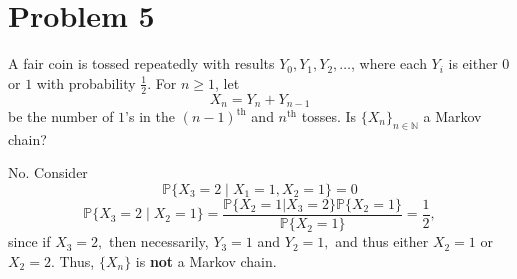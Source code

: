 \documentclass[11pt]{article}
\newcommand{\bbP}{\mathbb{P}}
\begin{document}
\section*{Problem 5}
\begin{problem}
    A fair coin is tossed repeatedly with results \( Y_0, Y_1, Y_2, \ldots \), where each \( Y_i \) is either \( 0 \) or \( 1 \) with probability \( \frac{1}{2} \). For \( n \geq 1 \), let 
\[
X_n = Y_n + Y_{n-1}
\]
be the number of \( 1 \)'s in the \( (n-1)^{\text{th}} \) and \( n^{\text{th}} \) tosses. Is \( \{X_n\}_{n \in \mathbb{N}} \) a Markov chain?
\end{problem}
\begin{solution}
    No. Consider 
    \[\bbP\{X_3 = 2 \mid X_1 = 1, X_2 = 1\} = 0\]
    \[\bbP\{X_3 = 2 \mid X_2 = 1\} = \frac{\bbP\{X_2 = 1 | X_3 = 2\}\bbP\{X_2 = 1\}}{\bbP\{X_2 = 1\}} = \frac{1}{2},\] since if $X_3 = 2,$ then necessarily, $Y_3 = 1$ and $Y_2 = 1,$ and thus either $X_2 = 1$ or $X_2 = 2.$ Thus, $\{X_n\}$ is \textbf{not} a Markov chain.
\end{solution}

\newpage
\end{document}
